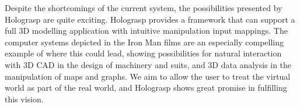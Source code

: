 \documentclass[pageno]{jpaper}
\begin{document}
Despite the shortcomings of the current system, the possibilities presented by Holograsp are quite exciting. Holograsp provides a framework that
can support a full 3D modelling application with intuitive manipulation input mappings. The computer systems depicted in the Iron Man films are
an especially compelling example of where this could lead, showing possibilities for natural interaction with 3D CAD in the design of machinery
and suits, and 3D data analysis in the manipulation of maps and graphs. We aim to allow the user to treat the virtual world as part of the real
world, and Holograsp shows great promise in fulfilling this vision.

\newpage
{}


\end{document}
